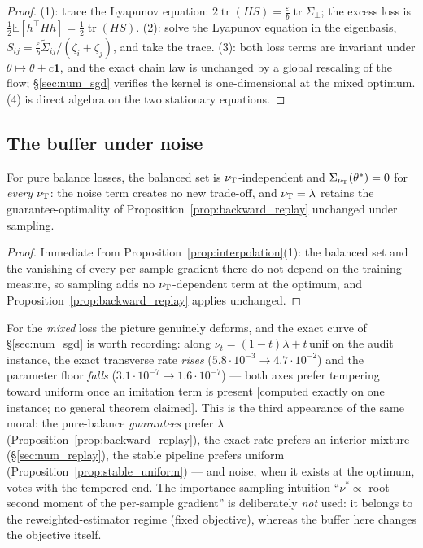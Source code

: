 \begin{proof}
(1): trace the Lyapunov equation: $2\operatorname{tr}(HS) =
\tfrac{\varepsilon}b\operatorname{tr}\Sigma_\perp$; the excess loss is
$\tfrac12\mathbb E[h^\top Hh] = \tfrac12\operatorname{tr}(HS)$. (2): solve the Lyapunov
equation in the eigenbasis, $S_{ij} = \tfrac{\varepsilon}b
\widetilde\Sigma_{ij}/(\zeta_i+\zeta_j)$, and take the trace. (3): both loss terms
are invariant under $\theta\mapsto\theta+c\mathbf 1$, and the exact chain law is
unchanged by a global rescaling of the flow; \S\ref{sec:num_sgd} verifies the kernel is
one-dimensional at the mixed optimum. (4) is direct algebra on the two stationary
equations.
\end{proof}

\subsection{The buffer under noise}\label{sec:buffer_noise}

\begin{proposition}\label{prop:buffer_robust}
For pure balance losses, the balanced set is $\nu_{\mathrm{T}}$-independent and
$\Sigma_{\nu_{\mathrm{T}}}(\theta^*)=0$ for \emph{every} $\nu_{\mathrm{T}}$: the noise term creates no
new trade-off, and $\nu_{\mathrm{T}}=\lambda$ retains the guarantee-optimality of
Proposition~\ref{prop:backward_replay} unchanged under sampling.
\end{proposition}

\begin{proof}
Immediate from Proposition~\ref{prop:interpolation}(1): the balanced set and the
vanishing of every per-sample gradient there do not depend on the training measure, so
sampling adds no $\nu_{\mathrm{T}}$-dependent term at the optimum, and
Proposition~\ref{prop:backward_replay} applies unchanged.
\end{proof}

For the \emph{mixed} loss the picture genuinely deforms, and the exact curve of
\S\ref{sec:num_sgd} is worth recording: along $\nu_t = (1-t)\lambda + t\,\mathrm{unif}$
on the audit instance, the exact transverse rate \emph{rises}
($5.8\cdot10^{-3}\to4.7\cdot10^{-2}$) and the parameter floor \emph{falls}
($3.1\cdot10^{-7}\to1.6\cdot10^{-7}$) --- both axes prefer tempering toward uniform once
an imitation term is present [computed exactly on one instance; no general theorem
claimed]. This is the third appearance of the same moral: the pure-balance
\emph{guarantees} prefer $\lambda$ (Proposition~\ref{prop:backward_replay}), the exact
rate prefers an interior mixture (\S\ref{sec:num_replay}), the stable pipeline prefers
uniform (Proposition~\ref{prop:stable_uniform}) --- and noise, when it exists at the
optimum, votes with the tempered end. The importance-sampling intuition
``$\nu^*\propto$ root second moment of the per-sample gradient'' is deliberately
\emph{not} used: it belongs to the reweighted-estimator regime (fixed objective),
whereas the buffer here changes the objective itself.

